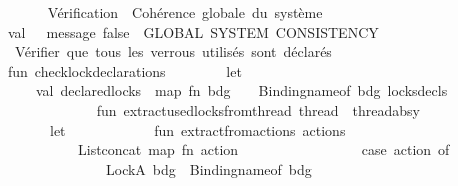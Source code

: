 \begin{isabellebody}
\ \ \ \ \isanewline
\ \ \ \ {\isacharparenleft}{\kern0pt}{\isacharasterisk}{\kern0pt}\ Vérification\ {}{\isacharcolon}{\kern0pt}\ Cohérence\ globale\ du\ système\ {\isacharasterisk}{\kern0pt}{\isacharparenright}{\kern0pt}\isanewline
\ \ \ \ val\ {\isacharunderscore}{\kern0pt}\ {\isacharequal}{\kern0pt}\ message\ false\ {\isachardoublequote}{\kern0pt}{\isacharequal}{\kern0pt}{\isacharequal}{\kern0pt}{\isacharequal}{\kern0pt}\ GLOBAL\ SYSTEM\ CONSISTENCY\ {\isacharequal}{\kern0pt}{\isacharequal}{\kern0pt}{\isacharequal}{\kern0pt}{\isachardoublequote}{\kern0pt}\isanewline
\ \ \ \ \isanewline
\ \ \ \ {\isacharparenleft}{\kern0pt}{\isacharasterisk}{\kern0pt}\ Vérifier\ que\ tous\ les\ verrous\ utilisés\ sont\ déclarés\ {\isacharasterisk}{\kern0pt}{\isacharparenright}{\kern0pt}\isanewline
\ \ \ \ fun\ check{\isacharunderscore}{\kern0pt}lock{\isacharunderscore}{\kern0pt}declarations\ {\isacharparenleft}{\kern0pt}{\isacharparenright}{\kern0pt}\ {\isacharequal}{\kern0pt}\isanewline
\ \ \ \ \ \ let\isanewline
\ \ \ \ \ \ \ \ val\ declared{\isacharunderscore}{\kern0pt}locks\ {\isacharequal}{\kern0pt}\ map\ {\isacharparenleft}{\kern0pt}fn\ {\isacharparenleft}{\kern0pt}bdg{\isacharcomma}{\kern0pt}\ {\isacharunderscore}{\kern0pt}{\isacharcomma}{\kern0pt}\ {\isacharunderscore}{\kern0pt}{\isacharparenright}{\kern0pt}\ {\isacharequal}{\kern0pt}{\isachargreater}{\kern0pt}\ Binding{\isachardot}{\kern0pt}name{\isacharunderscore}{\kern0pt}of\ bdg{\isacharparenright}{\kern0pt}\ locks{\isacharunderscore}{\kern0pt}decls\isanewline
\ \ \ \ \ \ \ \ \isanewline
\ \ \ \ \ \ \ \ fun\ extract{\isacharunderscore}{\kern0pt}used{\isacharunderscore}{\kern0pt}locks{\isacharunderscore}{\kern0pt}from{\isacharunderscore}{\kern0pt}thread\ {\isacharparenleft}{\kern0pt}thread\ {\isacharcolon}{\kern0pt}\ thread{\isacharunderscore}{\kern0pt}absy{\isacharparenright}{\kern0pt}\ {\isacharequal}{\kern0pt}\isanewline
\ \ \ \ \ \ \ \ \ \ let\isanewline
\ \ \ \ \ \ \ \ \ \ \ \ fun\ extract{\isacharunderscore}{\kern0pt}from{\isacharunderscore}{\kern0pt}actions\ actions\ {\isacharequal}{\kern0pt}\isanewline
\ \ \ \ \ \ \ \ \ \ \ \ \ \ List{\isachardot}{\kern0pt}concat\ {\isacharparenleft}{\kern0pt}map\ {\isacharparenleft}{\kern0pt}fn\ action\ {\isacharequal}{\kern0pt}{\isachargreater}{\kern0pt}\isanewline
\ \ \ \ \ \ \ \ \ \ \ \ \ \ \ \ case\ action\ of\isanewline
\ \ \ \ \ \ \ \ \ \ \ \ \ \ \ \ \ \ LockA\ bdg\ {\isacharequal}{\kern0pt}{\isachargreater}{\kern0pt}\ {\isacharbrackleft}{\kern0pt}Binding{\isachardot}{\kern0pt}name{\isacharunderscore}{\kern0pt}of\ bdg{\isacharbrackright}{\kern0pt}\isanewline

\end{isabellebody}
